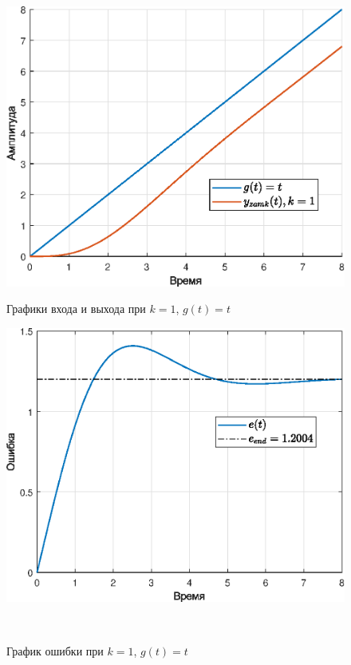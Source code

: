 \documentclass[a4paper]{article}
\begin{document}
\begin{figure}[H]
    \begin{minipage}{0.5\textwidth}
        \centering \includegraphics[width=\textwidth]{ex4/k1_g_vt.eps}
        \caption{Графики входа и выхода при $k=1$, $g(t)=t$}
    \end{minipage}\hfill
    \begin{minipage}{0.5\textwidth}
        \centering \includegraphics[width=\textwidth]{ex4/k1_g_vt_error.eps}
        \caption{График ошибки при $k=1$, $g(t)=t$}
    \end{minipage}\\[1em]
\end{figure}\noindent\
\end{document}
